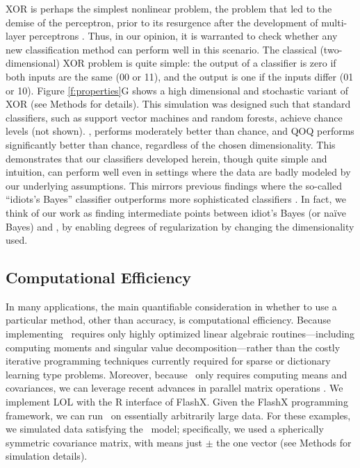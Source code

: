 \documentclass[10pt]{article}
\begin{document}
  XOR is perhaps the simplest nonlinear problem, the problem that led to the demise of the perceptron, prior to its resurgence after the development of multi-layer perceptrons \cite{Bishop2006a}.  Thus, in our opinion, it is warranted to check whether any new classification method can perform well in this scenario.  The classical (two-dimensional) XOR problem is quite simple: the output of a classifier is zero if both inputs are the same (00 or 11), and the output is one if the inputs differ (01 or 10).  Figure \ref{f:properties}G shows a high dimensional and stochastic variant of XOR (see Methods for details).  This simulation was designed such that standard classifiers, such as support vector machines and random forests, achieve chance levels (not shown).  \Lol, performs moderately better than chance, and QOQ performs significantly better than chance, regardless of the chosen dimensionality.  This demonstrates that our classifiers developed herein, though quite simple and intuition, can perform well even in settings where the data are badly modeled by our underlying assumptions.  This mirrors previous findings where the so-called ``idiots's Bayes'' classifier outperforms more sophisticated classifiers \cite{Bickel2004a}.  In fact, we think of our work as finding intermediate points between idiot's Bayes (or na\"ive Bayes) and \Fld, by enabling degrees of regularization by changing the dimensionality used.


\subsection*{Computational Efficiency}

In many applications, the main quantifiable consideration in whether to use a particular method, other than accuracy, is computational efficiency.  Because implementing \Lol~requires only highly optimized linear algebraic routines---including computing moments and singular value decomposition---rather than the costly iterative programming techniques currently required for sparse or dictionary learning type problems.  Moreover, because \Lol~only requires computing means and covariances, we can leverage recent advances in parallel matrix operations \cite{FlashMatrix}. We implement LOL with the R interface of FlashX.
Given the FlashX programming framework, we can run \Lol~on essentially arbitrarily large data.  For these examples, we simulated data satisfying the \Lda~model; specifically, we used a spherically symmetric covariance matrix, with means just $\pm$ the one vector (see Methods for simulation details).
\end{document}
